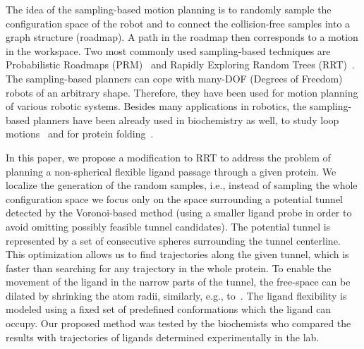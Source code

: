\documentclass[usletter, 10pt, conference]{ieeeconf} %
\begin{document}
The idea of the sampling-based motion planning is to randomly sample the configuration space of the robot and to connect the collision-free samples
into a graph structure (roadmap).
A path in the roadmap then corresponds to a motion in the workspace.
Two most commonly used sampling-based techniques are Probabilistic Roadmaps (PRM)~\cite{kavrakiForPP} and Rapidly Exploring Random Trees (RRT)~\cite{lavalleRRT}.
The sampling-based planners can cope with many-DOF (Degrees of Freedom) robots of an arbitrary shape.
Therefore, they have been used for motion planning of various robotic systems.
Besides many applications in robotics, the sampling-based planners have been already used in biochemistry as well, 
to study loop motions~\cite{cortes2004geometric}
and for protein folding~\cite{raveh2009rapid,novinskaya2015improving,amato2002using}.

In this paper, we propose a modification to RRT to address the problem of planning a non-spherical flexible ligand passage through a given protein.
We localize the generation of the random samples, i.e., instead of sampling the whole configuration space we focus only on the space surrounding a potential tunnel detected by the Voronoi-based method (using a smaller ligand probe in order to avoid omitting possibly feasible tunnel candidates).
The potential tunnel is represented by a set of consecutive spheres surrounding the tunnel centerline.
This optimization allows us to find trajectories along the given tunnel, which is faster than searching for any trajectory in the whole protein.
To enable the movement of the ligand in the narrow parts of the tunnel, the free-space can be dilated by shrinking the atom radii, similarly, e.g., to~\cite{cortes2005path,hsu06multilevel}. 
The ligand flexibility is modeled using a fixed set of predefined conformations which the ligand can occupy.
Our proposed method was tested by the biochemists who compared the results with trajectories of ligands determined experimentally in the lab.
\end{document}
